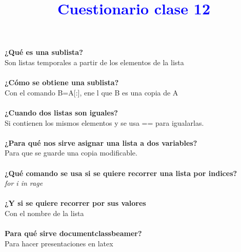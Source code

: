 \documentclass{book}
\begin{document}
	
		\begin{center}
		\title {\textcolor{blue}{\Huge \textbf{Cuestionario clase 12}} }  
	\end{center}
	\textbf{¿Qué es una sublista?}\\
	Son listas temporales a partir de los elementos de la lista\\
	\\
	\textbf{¿Cómo se obtiene una sublista?}\\
	Con el comando B=A[:], ene l que B es una copia de A\\
	\\
	\textbf{¿Cuando dos listas son iguales?}\\
	Si contienen los mismos elementos y se usa == para igualarlas.\\
	\\
	\textbf{¿Para qué nos sirve asignar una lista a dos variables?}\\
	Para que se guarde una copia modificable.\\
	\\
	\textbf{¿Qué comando se usa si se quiere recorrer una lista por indices?}\\
	\textit{for i in rage}\\
	\\
	\textbf{¿Y si se quiere recorrer por sus valores}\\
	Con el nombre de la lista \\
	\\ 
	\textbf{Para qué sirve documentclass{beamer}?}\\
	Para hacer presentaciones en latex
	
\end{document}
